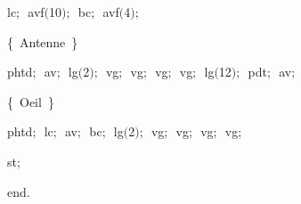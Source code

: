 {\vspace{\neglskip}\mbox{\blc  \blk\idt  lc$;$\ avf$($10$)$$;$\ bc$;$\ avf$($4$)$$;$}\par 
\vspace{\neglskip}\mbox{\blc  \blk\idt  \cmt  \{\ Antenne\ \}\idt }\par 
\vspace{\neglskip}\mbox{\blc  \blk\idt  phtd$;$\ av$;$\ lg$($2$)$$;$\ vg$;$\ vg$;$\ vg$;$\ vg$;$\ lg$($12$)$$;$\ pdt$;$\ av$;$}\par 
\vspace{\neglskip}\mbox{\blc  \blk\idt  \cmt  \{\ Oeil\ \}\idt }\par 
\vspace{\neglskip}\mbox{\blc  \blk\idt  phtd$;$\ lc$;$\ av$;$\ bc$;$\ lg$($2$)$$;$\ vg$;$\ vg$;$\ vg$;$\ vg$;$\ \ \ }\par 
\vspace{\neglskip}\mbox{\blc  \blk\idt  st$;$\ }\par 
\vspace{\neglskip}\mbox{\blc  \idt  \mcl end\idt $.$}\par 

\medskip }

